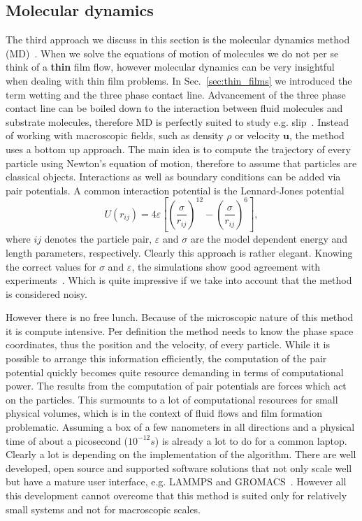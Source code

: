 \subsection{Molecular dynamics}
The third approach we discuss in this section is the molecular dynamics method (MD)~\cite{haileMolecularDynamicsSimulation1997, zhangMolecularSimulationThin2019, wengMolecularDynamicsInvestigation2000}.
When we solve the equations of motion of molecules we do not per se think of a \textbf{thin} film flow, however molecular dynamics can be very insightful when dealing with thin film problems. 
In Sec.~\ref{sec:thin_films} we introduced the term wetting and the three phase contact line.
Advancement of the three phase contact line can be boiled down to the interaction between fluid molecules and substrate molecules, therefore MD is perfectly suited to study e.g. slip~\cite{jabbarzadehWallSlipMolecular1999, segaRegularizationSlipLength2013}. 
Instead of working with macroscopic fields, such as density $\rho$ or velocity $\mathbf{u}$, the method uses a bottom up approach.
The main idea is to compute the trajectory of every particle using Newton's equation of motion, therefore to assume that particles are classical objects.
Interactions as well as boundary conditions can be added via pair potentials.
A common interaction potential is the Lennard-Jones potential
\begin{equation}\label{eq:Len-Jon}
    U(r_{ij}) = 4\varepsilon\left[\left(\frac{\sigma}{r_{ij}}\right)^{12}-\left(\frac{\sigma}{r_{ij}}\right)^6\right],
\end{equation}
where $ij$ denotes the particle pair, $\varepsilon$ and $\sigma$ are the model dependent energy and length parameters, respectively.
Clearly this approach is rather elegant.
Knowing the correct values for $\sigma$ and $\varepsilon$, the simulations show good agreement with experiments~\cite{zhangMolecularSimulationThin2019}.
Which is quite impressive if we take into account that the method is considered noisy.

However there is no free lunch. 
Because of the microscopic nature of this method it is compute intensive.
Per definition the method needs to know the phase space coordinates, thus the position and the velocity, of every particle.
While it is possible to arrange this information efficiently, the computation of the pair potential quickly becomes quite resource demanding in terms of computational power.
The results from the computation of pair potentials are forces which act on the particles.
This surmounts to a lot of computational resources for small physical volumes, which is in the context of fluid flows and film formation problematic.
Assuming a box of a few nanometers in all directions and a physical time of about a picosecond ($10^{-12}s$) is already a lot to do for a common laptop.
Clearly a lot is depending on the implementation of the algorithm. 
There are well developed, open source and supported software solutions that not only scale well but have a mature user interface, e.g. LAMMPS and GROMACS~\cite{plimptonFastParallelAlgorithms1995, berendsenGROMACSMessagepassingParallel1995, lindahlGROMACSPackageMolecular2001}.  
However all this development cannot overcome that this method is suited only for relatively small systems and not for macroscopic scales.

